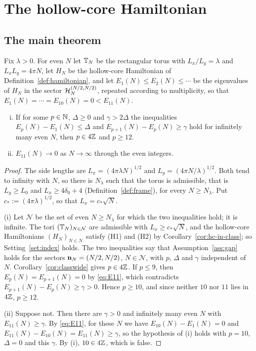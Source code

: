 \section{The hollow-core Hamiltonian}\label{sec:hollowcore}

\subsection{The main theorem}

\begin{theorem}\label{thm:main}
Fix $\lambda>0$. For even $N$ let $\mathbb{T}_N$ be the rectangular torus with $L_x/L_y=\lambda$ and $L_xL_y=4\pi N$, let
$H_N$ be the hollow-core Hamiltonian of Definition~\ref{def:hamiltonian}, and let $E_1(N)\le E_2(N)\le\cdots$ be the
eigenvalues of $H_N$ in the sector $\mathcal{H}_N^{(N/2,N/2)}$, repeated according to multiplicity, so that
$E_1(N)=\cdots=E_{10}(N)=0<E_{11}(N)$.
\begin{enumerate}[(i)]
\item If for some $p\in\mathbb{N}$, $\Delta\ge0$ and $\gamma>2\Delta$ the inequalities $E_p(N)-E_1(N)\le\Delta$ and
$E_{p+1}(N)-E_p(N)\ge\gamma$ hold for infinitely many even $N$, then $p\in4\mathbb{Z}$ and $p\ge12$.
\item $E_{11}(N)\to0$ as $N\to\infty$ through the even integers.
\end{enumerate}
\end{theorem}

\begin{proof}
The side lengths are $L_x=(4\pi\lambda N)^{1/2}$ and $L_y=(4\pi N/\lambda)^{1/2}$. Both tend to infinity with $N$, so
there is $N_\lambda$ such that the torus is admissible, that is $L_y\ge L_0$ and $L_x\ge4\delta_0+4$
(Definition~\ref{def:frame}), for every $N\ge N_\lambda$. Put $c_*:=(4\pi\lambda)^{1/2}$, so that $L_x=c_*\sqrt N$.

(i) Let $\mathcal N$ be the set of even $N\ge N_\lambda$ for which the two inequalities hold; it is infinite. The tori
$(\mathbb{T}_N)_{N\in\mathcal N}$ are admissible with $L_x\ge c_*\sqrt N$, and the hollow-core Hamiltonians
$(H_N)_{N\in\mathcal N}$ satisfy (H1) and (H2) by Corollary~\ref{cor:hc-in-class}; so Setting~\ref{set:index} holds. The two
inequalities say that Assumption~\ref{ass:gap} holds for the sectors $\mathbf{n}_N=(N/2,N/2)$, $N\in\mathcal N$, with $p$,
$\Delta$ and $\gamma$ independent of $N$. Corollary~\ref{cor:classwide} gives $p\in4\mathbb{Z}$. If $p\le9$, then
$E_p(N)=E_{p+1}(N)=0$ by \eqref{eq:E11}, which contradicts $E_{p+1}(N)-E_p(N)\ge\gamma>0$. Hence $p\ge10$, and since
neither $10$ nor $11$ lies in $4\mathbb{Z}$, $p\ge12$.

(ii) Suppose not. Then there are $\gamma>0$ and infinitely many even $N$ with $E_{11}(N)\ge\gamma$. By \eqref{eq:E11},
for these $N$ we have $E_{10}(N)-E_1(N)=0$ and $E_{11}(N)-E_{10}(N)=E_{11}(N)\ge\gamma$, so the hypothesis of (i) holds with
$p=10$, $\Delta=0$ and this $\gamma$. By (i), $10\in4\mathbb{Z}$, which is false.
\end{proof}

